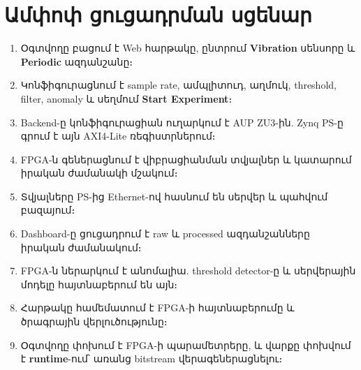 \chapter{Ամփոփ ցուցադրման սցենար}
\label{ch:demo}

\begin{enumerate}
  \item Օգտվողը բացում է Web հարթակը, ընտրում \textbf{Vibration} սենսորը և \textbf{Periodic} ազդանշանը։
  \item Կոնֆիգուրացնում է sample rate, ամպլիտուդ, աղմուկ, threshold, filter, anomaly և սեղմում \textbf{Start Experiment}։
  \item Backend-ը կոնֆիգուրացիան ուղարկում է AUP ZU3-ին. Zynq PS-ը գրում է այն AXI4-Lite ռեգիստրներում։
  \item FPGA-ն գեներացնում է վիբրացիանման տվյալներ և կատարում իրական ժամանակի մշակում։
  \item Տվյալները PS-ից Ethernet-ով հասնում են սերվեր և պահվում բազայում։
  \item Dashboard-ը ցուցադրում է raw և processed ազդանշանները իրական ժամանակում։
  \item FPGA-ն ներարկում է անոմալիա. threshold detector-ը և սերվերային մոդելը հայտնաբերում են այն։
  \item Հարթակը համեմատում է FPGA-ի հայտնաբերումը և ծրագրային վերլուծությունը։
  \item Օգտվողը փոխում է FPGA-ի պարամետրերը, և վարքը փոխվում է \textbf{runtime}-ում՝ առանց bitstream վերագեներացնելու։
\end{enumerate}
